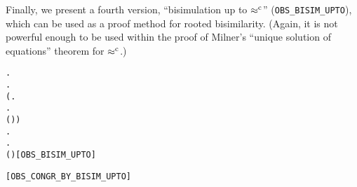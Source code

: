 Finally, we  present a fourth version, ``bisimulation up
to $\mathrel{\approx^{\rm{c}}}$'' (\texttt{OBS_BISIM_UPTO}), which can be used as a proof method for rooted
bisimilarity. (Again, it is not powerful enough to be used within
the proof of Milner's ``unique solution of equations''
theorem for $\mathrel{\approx^{\rm{c}}}$.)
\begin{alltt}
  \HOLSymConst{\HOLTokenDefEquality{}}
  \HOLSymConst{\HOLTokenForall{}} .
         \HOLSymConst{\HOLTokenImp{}}
      \HOLSymConst{\HOLTokenForall{}}.
          (\HOLSymConst{\HOLTokenForall{}}.
                \HOLTokenTransBegin{}\HOLTokenTransEnd {} \HOLSymConst{\HOLTokenImp{}}
               \HOLSymConst{\HOLTokenExists{}}.
                    \HOLTokenWeakTransBegin{}\HOLTokenWeakTransEnd {} \HOLSymConst{\HOLTokenConj{}}
                   ( \HOLSymConst{\HOLTokenRCompose{}}  \HOLSymConst{\HOLTokenRCompose{}} )  ) \HOLSymConst{\HOLTokenConj{}}
          \HOLSymConst{\HOLTokenForall{}}.
               \HOLTokenTransBegin{}\HOLTokenTransEnd {} \HOLSymConst{\HOLTokenImp{}}
              \HOLSymConst{\HOLTokenExists{}}.
                   \HOLTokenWeakTransBegin{}\HOLTokenWeakTransEnd {} \HOLSymConst{\HOLTokenConj{}}
                  ( \HOLSymConst{\HOLTokenRCompose{}}  \HOLSymConst{\HOLTokenRCompose{}} )  \hfill{[OBS_BISIM_UPTO]}

\HOLTokenTurnstile{}   \HOLSymConst{\HOLTokenConj{}}    \HOLSymConst{\HOLTokenImp{}}  \HOLSymConst{\HOLTokenObsCongr} \hfill{[OBS_CONGR_BY_BISIM_UPTO]}
\end{alltt}

